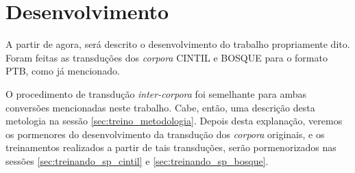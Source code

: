\chapter{Desenvolvimento}
\label{cap:desenv}

A partir de agora, será descrito o desenvolvimento do trabalho propriamente dito. Foram feitas as transduções dos \textit{corpora} CINTIL e BOSQUE para o formato PTB, como já mencionado. 

O procedimento de transdução \textit{inter-corpora} foi semelhante para ambas conversões mencionadas neste trabalho. Cabe, então, uma descrição desta metologia na sessão \ref{sec:treino_metodologia}. Depois desta explanação, veremos os pormenores do desenvolvimento da transdução dos \textit{corpora} originais, e os treinamentos realizados a partir de tais transduções, serão pormenorizados nas sessões \ref{sec:treinando_sp_cintil} e \ref{sec:treinando_sp_bosque}.  







